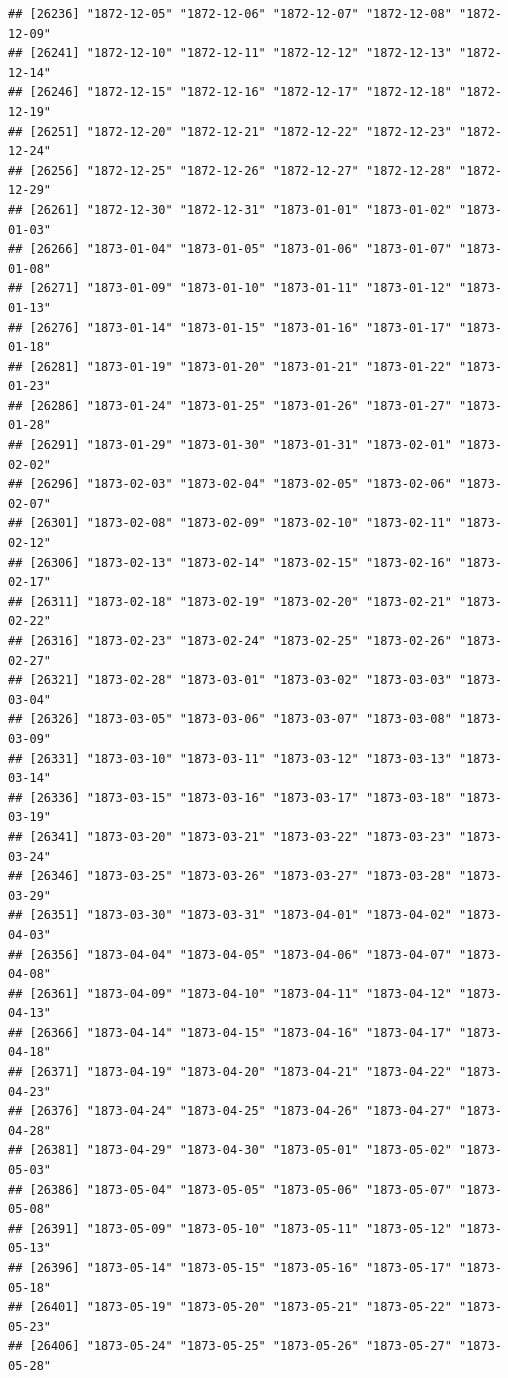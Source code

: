 \documentclass{article}\usepackage[]{graphicx}\usepackage[]{color}
\makeatletter
\newenvironment{kframe}{%
 \def\at@end@of@kframe{}%
 \ifinner\ifhmode%
  \def\at@end@of@kframe{\end{minipage}}%
  \begin{minipage}{\columnwidth}%
 \fi\fi%
 \def\FrameCommand##1{\hskip\@totalleftmargin \hskip-\fboxsep
 \colorbox{shadecolor}{##1}\hskip-\fboxsep
     \hskip-\linewidth \hskip-\@totalleftmargin \hskip\columnwidth}%
 \MakeFramed {\advance\hsize-\width
   \@totalleftmargin\z@ \linewidth\hsize
   \@setminipage}}%
 {\par\unskip\endMakeFramed%
 \at@end@of@kframe}
\newenvironment{knitrout}{}{} %
\makeatother
\begin{document}
\begin{description}
\begin{knitrout}
\begin{kframe}
\begin{verbatim}
## [26236] "1872-12-05" "1872-12-06" "1872-12-07" "1872-12-08" "1872-12-09"
## [26241] "1872-12-10" "1872-12-11" "1872-12-12" "1872-12-13" "1872-12-14"
## [26246] "1872-12-15" "1872-12-16" "1872-12-17" "1872-12-18" "1872-12-19"
## [26251] "1872-12-20" "1872-12-21" "1872-12-22" "1872-12-23" "1872-12-24"
## [26256] "1872-12-25" "1872-12-26" "1872-12-27" "1872-12-28" "1872-12-29"
## [26261] "1872-12-30" "1872-12-31" "1873-01-01" "1873-01-02" "1873-01-03"
## [26266] "1873-01-04" "1873-01-05" "1873-01-06" "1873-01-07" "1873-01-08"
## [26271] "1873-01-09" "1873-01-10" "1873-01-11" "1873-01-12" "1873-01-13"
## [26276] "1873-01-14" "1873-01-15" "1873-01-16" "1873-01-17" "1873-01-18"
## [26281] "1873-01-19" "1873-01-20" "1873-01-21" "1873-01-22" "1873-01-23"
## [26286] "1873-01-24" "1873-01-25" "1873-01-26" "1873-01-27" "1873-01-28"
## [26291] "1873-01-29" "1873-01-30" "1873-01-31" "1873-02-01" "1873-02-02"
## [26296] "1873-02-03" "1873-02-04" "1873-02-05" "1873-02-06" "1873-02-07"
## [26301] "1873-02-08" "1873-02-09" "1873-02-10" "1873-02-11" "1873-02-12"
## [26306] "1873-02-13" "1873-02-14" "1873-02-15" "1873-02-16" "1873-02-17"
## [26311] "1873-02-18" "1873-02-19" "1873-02-20" "1873-02-21" "1873-02-22"
## [26316] "1873-02-23" "1873-02-24" "1873-02-25" "1873-02-26" "1873-02-27"
## [26321] "1873-02-28" "1873-03-01" "1873-03-02" "1873-03-03" "1873-03-04"
## [26326] "1873-03-05" "1873-03-06" "1873-03-07" "1873-03-08" "1873-03-09"
## [26331] "1873-03-10" "1873-03-11" "1873-03-12" "1873-03-13" "1873-03-14"
## [26336] "1873-03-15" "1873-03-16" "1873-03-17" "1873-03-18" "1873-03-19"
## [26341] "1873-03-20" "1873-03-21" "1873-03-22" "1873-03-23" "1873-03-24"
## [26346] "1873-03-25" "1873-03-26" "1873-03-27" "1873-03-28" "1873-03-29"
## [26351] "1873-03-30" "1873-03-31" "1873-04-01" "1873-04-02" "1873-04-03"
## [26356] "1873-04-04" "1873-04-05" "1873-04-06" "1873-04-07" "1873-04-08"
## [26361] "1873-04-09" "1873-04-10" "1873-04-11" "1873-04-12" "1873-04-13"
## [26366] "1873-04-14" "1873-04-15" "1873-04-16" "1873-04-17" "1873-04-18"
## [26371] "1873-04-19" "1873-04-20" "1873-04-21" "1873-04-22" "1873-04-23"
## [26376] "1873-04-24" "1873-04-25" "1873-04-26" "1873-04-27" "1873-04-28"
## [26381] "1873-04-29" "1873-04-30" "1873-05-01" "1873-05-02" "1873-05-03"
## [26386] "1873-05-04" "1873-05-05" "1873-05-06" "1873-05-07" "1873-05-08"
## [26391] "1873-05-09" "1873-05-10" "1873-05-11" "1873-05-12" "1873-05-13"
## [26396] "1873-05-14" "1873-05-15" "1873-05-16" "1873-05-17" "1873-05-18"
## [26401] "1873-05-19" "1873-05-20" "1873-05-21" "1873-05-22" "1873-05-23"
## [26406] "1873-05-24" "1873-05-25" "1873-05-26" "1873-05-27" "1873-05-28"

\end{verbatim}
\end{kframe}
\end{knitrout}
\end{description}
\end{document}
